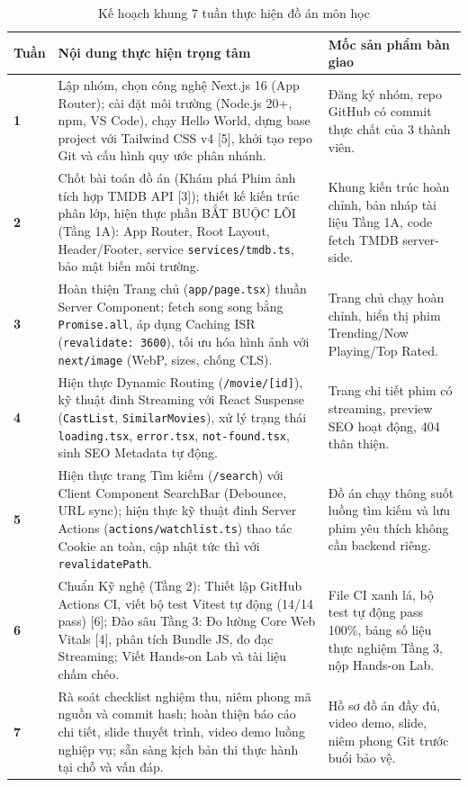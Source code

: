 \documentclass[13pt,a4paper]{extarticle}
\begin{document}
\begin{table}[H]
\centering
\caption{Kế hoạch khung 7 tuần thực hiện đồ án môn học}
\label{tab:schedule_7w}
\begin{tabularx}{\textwidth}{>{\centering\arraybackslash}p{1.2cm}>{\raggedright\arraybackslash}p{7.8cm}>{\raggedright\arraybackslash}X}
\toprule
\textbf{Tuần} & \textbf{Nội dung thực hiện trọng tâm} & \textbf{Mốc sản phẩm bàn giao} \\
\midrule
\textbf{1} & Lập nhóm, chọn công nghệ Next.js 16 (App Router); cài đặt môi trường (Node.js 20+, npm, VS Code), chạy Hello World, dựng base project với Tailwind CSS v4 [5], khởi tạo repo Git và cấu hình quy ước phân nhánh. & Đăng ký nhóm, repo GitHub có commit thực chất của 3 thành viên. \\
\midrule
\textbf{2} & Chốt bài toán đồ án (Khám phá Phim ảnh tích hợp TMDB API [3]); thiết kế kiến trúc phân lớp, hiện thực phần BẮT BUỘC LÕI (Tầng 1A): App Router, Root Layout, Header/Footer, service \texttt{services/tmdb.ts}, bảo mật biến môi trường. & Khung kiến trúc hoàn chỉnh, bản nháp tài liệu Tầng 1A, code fetch TMDB server-side. \\
\midrule
\textbf{3} & Hoàn thiện Trang chủ (\texttt{app/page.tsx}) thuần Server Component; fetch song song bằng \texttt{Promise.all}, áp dụng Caching ISR (\texttt{revalidate: 3600}), tối ưu hóa hình ảnh với \texttt{next/image} (WebP, sizes, chống CLS). & Trang chủ chạy hoàn chỉnh, hiển thị phim Trending/Now Playing/Top Rated. \\
\midrule
\textbf{4} & Hiện thực Dynamic Routing (\texttt{/movie/[id]}), kỹ thuật đinh Streaming với React Suspense (\texttt{CastList}, \texttt{SimilarMovies}), xử lý trạng thái \texttt{loading.tsx}, \texttt{error.tsx}, \texttt{not-found.tsx}, sinh SEO Metadata tự động. & Trang chi tiết phim có streaming, preview SEO hoạt động, 404 thân thiện. \\
\midrule
\textbf{5} & Hiện thực trang Tìm kiếm (\texttt{/search}) với Client Component SearchBar (Debounce, URL sync); hiện thực kỹ thuật đinh Server Actions (\texttt{actions/watchlist.ts}) thao tác Cookie an toàn, cập nhật tức thì với \texttt{revalidatePath}. & Đồ án chạy thông suốt luồng tìm kiếm và lưu phim yêu thích không cần backend riêng. \\
\midrule
\textbf{6} & Chuẩn Kỹ nghệ (Tầng 2): Thiết lập GitHub Actions CI, viết bộ test Vitest tự động (14/14 pass) [6]; Đào sâu Tầng 3: Đo lường Core Web Vitals [4], phân tích Bundle JS, đo đạc Streaming; Viết Hands-on Lab và tài liệu chấm chéo. & File CI xanh lá, bộ test tự động pass 100\%, bảng số liệu thực nghiệm Tầng 3, nộp Hands-on Lab. \\
\midrule
\textbf{7} & Rà soát checklist nghiệm thu, niêm phong mã nguồn và commit hash; hoàn thiện báo cáo chi tiết, slide thuyết trình, video demo luồng nghiệp vụ; sẵn sàng kịch bản thi thực hành tại chỗ và vấn đáp. & Hồ sơ đồ án đầy đủ, video demo, slide, niêm phong Git trước buổi bảo vệ. \\
\bottomrule
\end{tabularx}
\end{table}
\end{document}
